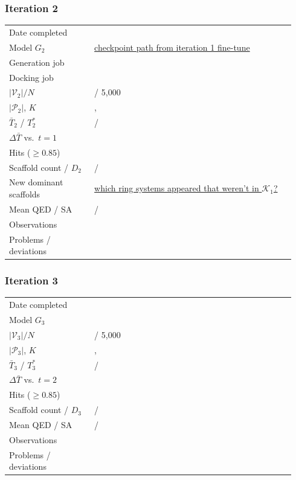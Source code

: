 \documentclass[11pt]{article}
\newcommand{\FILL}[1]{\textcolor{blue!65!black}{\underline{\textsf{#1}}}}
\newcommand{\Gmodel}{G}                         %
\newcommand{\Valid}{\mathcal{V}}                %
\newcommand{\Passed}{\mathcal{P}}               %
\newcommand{\TopK}{\mathcal{K}}                 %
\newcommand{\Tbar}{\bar{T}}
\newcommand{\Tstar}{T^{*}}
\newcommand{\Ngen}{N}
\newcommand{\Kk}{K}
\begin{document}
\subsubsection*{Iteration 2}
\begin{guide}[Log]
\begin{tabular}{@{}p{0.28\linewidth}p{0.66\linewidth}@{}}
Date completed        & \FILL{} \\
Model $\Gmodel_2$     & \FILL{checkpoint path from iteration 1 fine-tune} \\
Generation job        & \FILL{} \\
Docking job           & \FILL{} \\
$|\Valid_2| / \Ngen$  & \FILL{} / 5{,}000 \\
$|\Passed_2|$, $\Kk$  & \FILL{} , \FILL{} \\
$\Tbar_2$ / $\Tstar_2$& \FILL{} / \FILL{} \\
$\Delta \Tbar$ vs.\ $t=1$ & \FILL{} \\
Hits ($\ge 0.85$)     & \FILL{} \\
Scaffold count / $D_2$& \FILL{} / \FILL{} \\
New dominant scaffolds& \FILL{which ring systems appeared that weren't in
                        $\TopK_1$?} \\
Mean QED / SA         & \FILL{} / \FILL{} \\
Observations          & \FILL{} \\
Problems / deviations & \FILL{} \\
\end{tabular}
\end{guide}

\subsubsection*{Iteration 3}
\begin{guide}
\begin{tabular}{@{}p{0.28\linewidth}p{0.66\linewidth}@{}}
Date completed        & \FILL{} \\
Model $\Gmodel_3$     & \FILL{} \\
$|\Valid_3| / \Ngen$  & \FILL{} / 5{,}000 \\
$|\Passed_3|$, $\Kk$  & \FILL{} , \FILL{} \\
$\Tbar_3$ / $\Tstar_3$& \FILL{} / \FILL{} \\
$\Delta \Tbar$ vs.\ $t=2$ & \FILL{} \\
Hits ($\ge 0.85$)     & \FILL{} \\
Scaffold count / $D_3$& \FILL{} / \FILL{} \\
Mean QED / SA         & \FILL{} / \FILL{} \\
Observations          & \FILL{} \\
Problems / deviations & \FILL{} \\
\end{tabular}
\end{guide}
\end{document}
